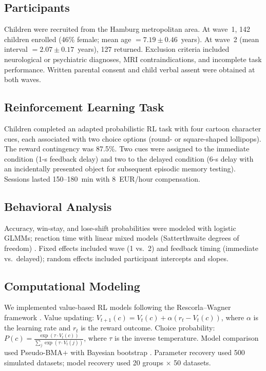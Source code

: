 \documentclass[11pt]{article}
\begin{document}
\subsection{Participants}

Children were recruited from the Hamburg metropolitan area. At wave~1, 142 children enrolled (46\% female; mean age $= 7.19 \pm 0.46$~years). At wave~2 (mean interval $= 2.07 \pm 0.17$~years), 127 returned. Exclusion criteria included neurological or psychiatric diagnoses, MRI contraindications, and incomplete task performance. Written parental consent and child verbal assent were obtained at both waves.

\subsection{Reinforcement Learning Task}

Children completed an adapted probabilistic RL task with four cartoon character cues, each associated with two choice options (round- or square-shaped lollipops). The reward contingency was 87.5\%. Two cues were assigned to the immediate condition (1-s feedback delay) and two to the delayed condition (6-s delay with an incidentally presented object for subsequent episodic memory testing). Sessions lasted 150--180~min with 8~EUR/hour compensation.

\subsection{Behavioral Analysis}

Accuracy, win-stay, and lose-shift probabilities were modeled with logistic GLMMs; reaction time with linear mixed models (Satterthwaite degrees of freedom) \citep{baayen2008mixed}. Fixed effects included wave (1 vs.\ 2) and feedback timing (immediate vs.\ delayed); random effects included participant intercepts and slopes.

\subsection{Computational Modeling}

We implemented value-based RL models following the Rescorla--Wagner framework \citep{rescorla1972theory, sutton1998reinforcement}. Value updating: $V_{t+1}(c) = V_t(c) + \alpha(r_t - V_t(c))$, where $\alpha$ is the learning rate and $r_t$ is the reward outcome. Choice probability: $P(c) = \frac{\exp(\tau \cdot V_t(c))}{\sum_j \exp(\tau \cdot V_t(j))}$, where $\tau$ is the inverse temperature. Model comparison used Pseudo-BMA$+$ with Bayesian bootstrap \citep{yao2018using}. Parameter recovery used 500 simulated datasets; model recovery used 20 groups $\times$ 50 datasets.
\end{document}
